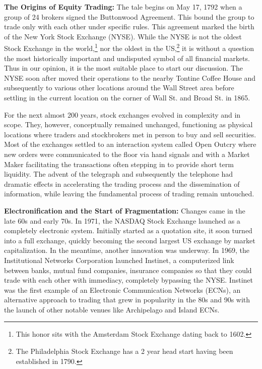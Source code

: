 \noindent\textbf{The Origins of Equity Trading:} The tale begins on May 17, 1792 when a group of 24 brokers signed the Buttonwood Agreement. This bound the group to trade only with each other under specific rules. This agreement marked the birth of the New York Stock Exchange (NYSE). While the NYSE is not the oldest Stock Exchange in the world,\footnote{This honor sits with the Amsterdam Stock Exchange dating back to 1602.} nor the oldest in the US,\footnote{The Philadelphia Stock Exchange has a 2 year head start having been established in 1790.} it is without a question the most historically important and undisputed symbol of all financial markets. Thus in our opinion, it is the most suitable place to start our discussion. The NYSE soon after moved their operations to the nearby Tontine Coffee House and subsequently to various other locations around the Wall Street area before settling in the current location on the corner of Wall St. and Broad St. in 1865.


For the next almost 200 years, stock exchanges evolved in complexity and in scope. They, however, conceptually remained unchanged, functioning as physical locations where traders and stockbrokers met in person to buy and sell securities. Most of the exchanges settled to an interaction system called Open Outcry where new orders were communicated to the floor via hand signals and with a Market Maker facilitating the transactions often stepping in to provide short term liquidity. The advent of the telegraph and subsequently the telephone had dramatic effects in accelerating the trading process and the dissemination of information, while leaving the fundamental process of trading remain untouched. \twomedskip


\noindent\textbf{Electronification and the Start of Fragmentation:} Changes came in the late 60s and early 70s. In 1971, the NASDAQ Stock Exchange launched as a completely electronic system. Initially started as a quotation site, it soon turned into a full exchange, quickly becoming the second largest US exchange by market capitalization. In the meantime, another innovation was underway. In 1969, the Institutional Networks Corporation launched Instinet, a computerized link between banks, mutual fund companies, insurance companies so that they could trade with each other with immediacy, completely bypassing the NYSE. Instinet was the first example of an Electronic Communication Networks (ECNs), an alternative approach to trading that grew in popularity in the 80s and 90s with the launch of other notable venues like Archipelago and Island ECNs.


